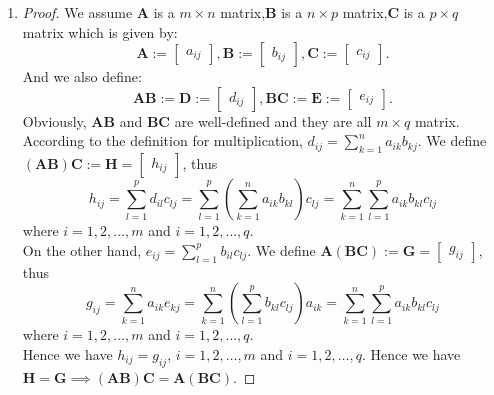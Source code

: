 \begin{enumerate}
\item
\begin{proof}
We assume $\bm A$ is a $m\times n$ matrix,$\bm B$ is a $n\times p$ matrix,$\bm C$ is a $p\times q$ matrix which is given by:
\[ \bm A := \begin{bmatrix}a_{ij}\end{bmatrix},\bm B := \begin{bmatrix}b_{ij}\end{bmatrix},
\bm C := \begin{bmatrix}c_{ij}\end{bmatrix}.
\]
And we also define:
\[
\bm{AB} := \bm{D} := \begin{bmatrix}d_{ij}\end{bmatrix},
\bm{BC} := \bm{E} := \begin{bmatrix}e_{ij}\end{bmatrix}.
\]
Obviously, $\bm{AB}$ and $\bm{BC}$ are well-defined and they are all $m \times q$ matrix.\\
\textbullet According to the definition for multiplication, $d_{ij} = \sum_{k=1}^n a_{ik}b_{kj}$. We define $(\bm{AB})\bm{C} := \bm{H} = \begin{bmatrix}h_{ij}\end{bmatrix}$, thus
\[
h_{ij} = \sum_{l=1}^p d_{il}c_{lj} = \sum_{l=1}^p(\sum_{k=1}^n a_{ik}b_{kl})c_{lj} = \sum_{k=1}^n\sum_{l=1}^pa_{ik}b_{kl}c_{lj}
\]
where $i=1,2,\dots,m$ and $i=1,2,\dots,q$.\\
\textbullet On the other hand, $e_{ij} = \sum_{l=1}^p b_{il}c_{lj}$. We define $\bm{A}(\bm{BC}) := \bm{G} = \begin{bmatrix}g_{ij}\end{bmatrix}$, thus
\[
g_{ij} = \sum_{k=1}^n a_{ik}e_{kj} = \sum_{k=1}^n(\sum_{l=1}^p b_{kl}c_{lj})a_{ik} = \sum_{k=1}^n\sum_{l=1}^pa_{ik}b_{kl}c_{lj}
\]
where $i=1,2,\dots,m$ and $i=1,2,\dots,q$.\\
Hence we have $h_{ij} = g_{ij}$, $i=1,2,\dots,m$ and $i=1,2,\dots,q$. 
Hence we have $\bm H = \bm G \implies (\bm{AB})\bm{C}=\bm{A}(\bm{BC})$.
\end{proof}


\end{enumerate}
